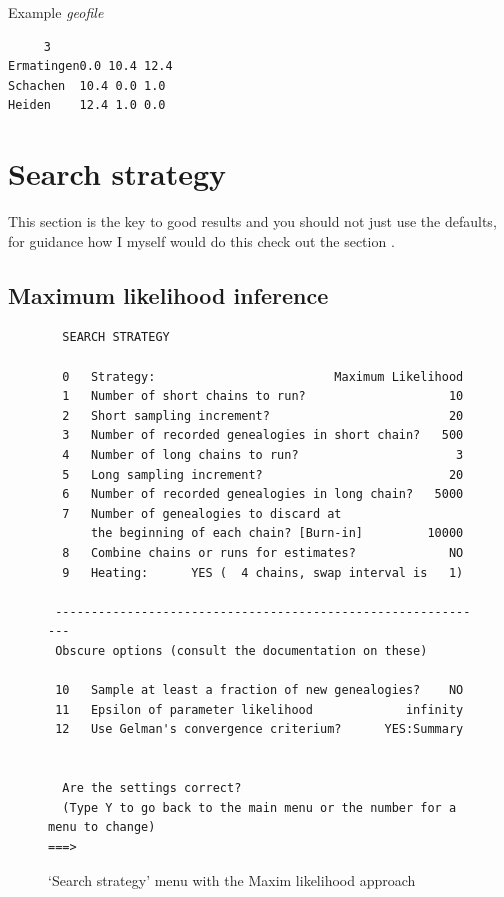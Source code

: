 Example {\it geofile}\\
\begin{verbatim}
     3
Ermatingen0.0 10.4 12.4 
Schachen  10.4 0.0 1.0
Heiden    12.4 1.0 0.0
\end{verbatim}
\newpage
\section{Search strategy}
This section is the key to good results and you should not just use the defaults, for guidance how I myself would do this check out the section {}.

\subsection{Maximum likelihood inference}
\begin{figure}[bh]

\begin{center}

\begin{boxedminipage}{6in}
\begin{small}
\begin{tt}
\begin{verbatim}
  SEARCH STRATEGY

  0   Strategy:                         Maximum Likelihood
  1   Number of short chains to run?                    10
  2   Short sampling increment?                         20
  3   Number of recorded genealogies in short chain?   500
  4   Number of long chains to run?                      3
  5   Long sampling increment?                          20
  6   Number of recorded genealogies in long chain?   5000
  7   Number of genealogies to discard at 
      the beginning of each chain? [Burn-in]         10000
  8   Combine chains or runs for estimates?             NO
  9   Heating:      YES (  4 chains, swap interval is   1)

 -------------------------------------------------------------
 Obscure options (consult the documentation on these)

 10   Sample at least a fraction of new genealogies?    NO
 11   Epsilon of parameter likelihood             infinity
 12   Use Gelman's convergence criterium?      YES:Summary


  Are the settings correct?
  (Type Y to go back to the main menu or the number for a menu to change)
===>
\end{verbatim}
\end{tt}
\end{small}
\end{boxedminipage}
\end{center}
\caption{{\sf `Search strategy' menu with the Maxim likelihood approach}}
\label{SEARCHMA}
\end{figure}


